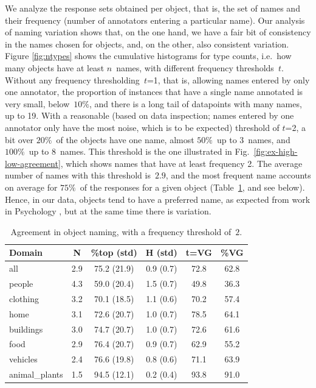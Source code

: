 We analyze the response sets obtained per object, that is, the set of names and their frequency (number of annotators entering a particular name).
Our analysis of naming variation shows that, on the one hand, we have a fair bit of consistency in the names chosen for objects, and, on the other, also consistent variation.
Figure \ref{fig:ntypes} shows the cumulative histograms for type counts, i.e.\ how many objects have at least $n$\ names, with different frequency thresholds~$t$.
Without any frequency thresholding~\mbox{$t$=1}, that is, allowing names entered by only one annotator, the proportion of instances that have a single name annotated is very small, below\ $10\%$, and there is a long tail of datapoints with many names, up to 19. 
With a reasonable (based on data inspection; names entered by one annotator only have the most noise, which is to be expected) threshold of $t$=2, a bit over $20\%$\ of the objects have one name, almost $50\%$\ up to $3$\ names, and $100\%$\ up to $8$\ names.
This threshold is the one illustrated in Fig.~\ref{fig:ex-high-low-agreement}, which shows names that have at least frequency 2.
The average number of names with this threshold is\ $2.9$, and the most frequent name accounts on average for $75\%$\ of the responses for a given object (Table~\ref{tab:agree}, and see below).
Hence, in our data, objects tend to have a preferred name, as expected from work in Psychology \cite{rosch1976basic,jolicoeur1984pictures}, but at the same time there is variation.

\begin{table}
\centering
\small
\begin{tabular}{lccccc}
  \toprule
  Domain &    N &         \%top (std) &          H (std) & t=VG &   \%VG \\
  \midrule
  all &  2.9 &  75.2 (21.9) &  0.9 (0.7) &   72.8 &  62.8 \\
  \midrule
  people &  4.3 &  59.0 (20.4) &  1.5 (0.7) &   49.8 &  36.3 \\
  clothing &  3.2 &  70.1 (18.5) &  1.1 (0.6) &   70.2 &  57.4\\
  home &  3.1 &  72.6 (20.7) &  1.0 (0.7) &   78.5 &  64.1 \\
  buildings &  3.0 &  74.7 (20.7) &  1.0 (0.7) &   72.6 &  61.6\\
  food &  2.9 &  76.4 (20.7) &  0.9 (0.7) &   62.9 &  55.2 \\
  vehicles &  2.4 &  76.6 (19.8) &  0.8 (0.6) &   71.1 &  63.9 \\
  animal\_plants &  1.5 &  94.5 (12.1) &  0.2 (0.4) &   93.8 &  91.0\\
\bottomrule
\end{tabular}
\vspace{-0.3cm}
\caption{Agreement in object naming, with a frequency threshold of~$2$.}
\label{tab:agree}
\end{table}

